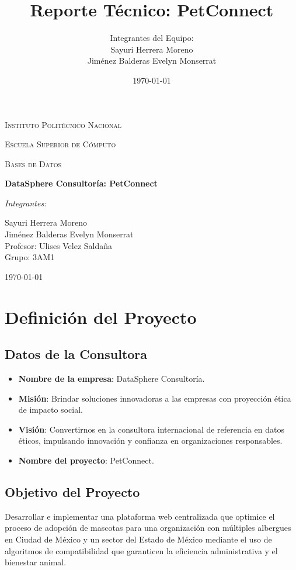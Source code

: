 \documentclass[12pt,a4paper]{article}
\title{Reporte Técnico: PetConnect}
\author{Integrantes del Equipo: \\ Sayuri Herrera Moreno \\ Jiménez Balderas Evelyn Monserrat }
\date{\today}
\begin{document}
\begin{titlepage}
    \centering
    {\scshape\LARGE Instituto Politécnico Nacional \par}
    {\scshape\Large Escuela Superior de Cómputo \par}
    \vspace{1cm}
    {\scshape\Large Bases de Datos \par}
    \vspace{1.5cm}
    {\huge\bfseries DataSphere Consultoría: PetConnect \par}
    \vspace{2cm}
    {\Large\itshape Integrantes: \par}
    Sayuri Herrera Moreno \\
    Jiménez Balderas Evelyn Monserrat \\
    \vfill
    Profesor: Ulises Velez Saldaña \\
    Grupo: 3AM1
    \vfill
    {\large \today \par}
\end{titlepage}

\tableofcontents
\newpage
\listoffigures
\newpage

\section{Definición del Proyecto}
\subsection{Datos de la Consultora}
\begin{itemize}
    \item \textbf{Nombre de la empresa}: DataSphere Consultoría.
    \item \textbf{Misión}: Brindar soluciones innovadoras a las empresas con proyección ética de impacto social.
    \item \textbf{Visión}: Convertirnos en la consultora internacional de referencia en datos éticos, impulsando innovación y confianza en organizaciones responsables.
    \item \textbf{Nombre del proyecto}: PetConnect.
\end{itemize}

\subsection{Objetivo del Proyecto}
Desarrollar e implementar una plataforma web centralizada que optimice el proceso de adopción de mascotas para una organización con múltiples albergues en Ciudad de México y un sector del Estado de México mediante el uso de algoritmos de compatibilidad que garanticen la eficiencia administrativa y el bienestar animal.
\end{document}
